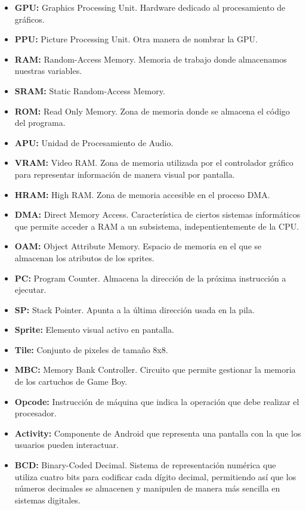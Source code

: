 \begin{itemize}
	\item \textbf{GPU:} Graphics Processing Unit. Hardware dedicado al procesamiento de gráficos.
    \item \textbf{PPU:} Picture Processing Unit. Otra manera de nombrar la GPU.
	\item \textbf{RAM:} Random-Access Memory. Memoria de trabajo donde almacenamos nuestras variables.
    \item \textbf{SRAM:} Static Random-Access Memory.
    \item \textbf{ROM:} Read Only Memory. Zona de memoria donde se almacena el código del programa.
    \item \textbf{APU:} Unidad de Procesamiento de Audio.
	\item \textbf{VRAM:} Video RAM. Zona de memoria utilizada por el controlador gráfico para representar información de manera visual por pantalla.
	\item \textbf{HRAM:} High RAM. Zona de memoria accesible en el proceso DMA. 
    \item \textbf{DMA:} Direct Memory Access. Característica de ciertos sistemas informáticos que permite acceder a RAM a un subsistema, indepentientemente de la CPU.
    \item \textbf{OAM:} Object Attribute Memory. Espacio de memoria en el que se almacenan los atributos de los sprites.
    \item \textbf{PC:} Program Counter. Almacena la dirección de la próxima instrucción a ejecutar.
    \item \textbf{SP:} Stack Pointer. Apunta a la última dirección usada en la pila.
    \item \textbf{Sprite:} Elemento visual activo en pantalla.
	\item \textbf{Tile:} Conjunto de pixeles de tamaño 8x8.
    \item \textbf{MBC:} Memory Bank Controller. Circuito que permite gestionar la memoria de los cartuchos de Game Boy.
    \item \textbf{Opcode:} Instrucción de máquina que indica la operación que debe realizar el procesador.
    \item \textbf{Activity:} Componente de Android que representa una pantalla con la que los usuarios pueden interactuar.
    \item \textbf{BCD:} Binary-Coded Decimal. Sistema de representación numérica que utiliza cuatro bits para codificar cada dígito decimal, permitiendo así que los números decimales se almacenen y manipulen de manera más sencilla en sistemas digitales.

\end{itemize}
